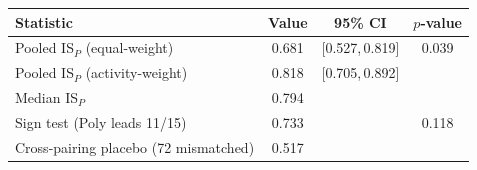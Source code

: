 \begin{tabular}{lccc}
\toprule
Statistic & Value & 95\% CI & $p$-value \\
\midrule
Pooled IS$_{P}$ (equal-weight) & 0.681 & [0.527,\,0.819] & 0.039 \\
Pooled IS$_{P}$ (activity-weight) & 0.818 & [0.705,\,0.892] &  \\
Median IS$_{P}$ & 0.794 &  &  \\
Sign test (Poly leads 11/15) & 0.733 &  & 0.118 \\
Cross-pairing placebo (72 mismatched) & 0.517 &  &  \\
\bottomrule
\end{tabular}